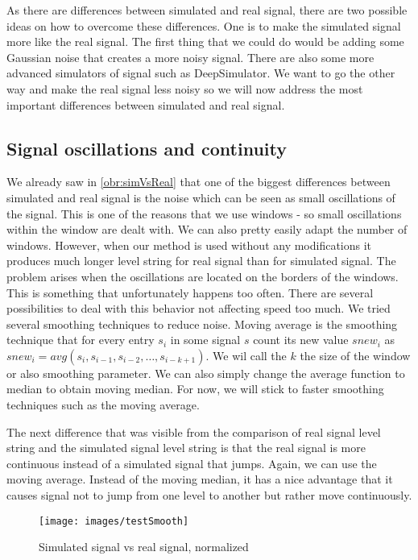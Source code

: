 As there are differences between simulated and real signal, there are two possible
ideas on how to overcome these differences. One is to make the simulated signal more like
the real signal. The first thing that we could do would be adding some Gaussian noise
that creates a more noisy signal. There are also some more advanced simulators of
signal such as DeepSimulator\cite{deepsimulator}. We want to go the other way and make the real signal
less noisy so we will now address the most important differences between simulated and real signal.

\subsection{Signal oscillations and continuity}

We already saw in \ref{obr:simVsReal} that one of the biggest differences between simulated and
real signal is the noise which can be seen as small oscillations of the signal. This is
one of the reasons that we use windows - so small oscillations within the window
are dealt with. We can also pretty easily adapt the number of windows.
However, when our method is used without any modifications it
produces much longer level string for real signal than for simulated signal.
The problem arises when the oscillations are located on the borders of the windows.
This is something that unfortunately happens too often. There are several
possibilities to deal with this behavior not affecting speed too
much. We tried several smoothing techniques to reduce noise. Moving average is the
smoothing technique that for every entry $s_i$ in some signal $s$ count its new value
$snew_i$ as $snew_i = avg(s_{i}, s_{i-1}, s_{i-2}, \dots , s_{i-k+1})$. We wil call the
$k$ the size of the window or also smoothing parameter. We can also simply change
the average function to median to obtain moving median. For now, we will stick
to faster smoothing techniques such as the moving average.

The next difference that was visible from the comparison of real signal level string
and the simulated signal level string is that the real signal is more continuous instead
of a simulated signal that jumps. Again, we can use the moving average. Instead of
the moving median, it has a nice advantage that it causes signal not to jump from
one level to another but rather move continuously.

\begin{figure}
\centerline{\texttt{[image: images/testSmooth]}}
\caption[Hehe]{Simulated signal vs real signal, normalized}
\label{obr:testSmooth}
\end{figure}

